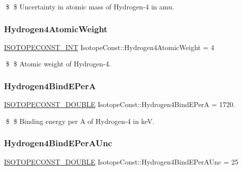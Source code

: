 \$ \$ Uncertainty in atomic mass of Hydrogen-\/4 in amu. \mbox{\label{group___isotope_const-_hydrogen-_h4_ga92d27018469bc93643e4c153de84386b}} 
\subsubsection{\texorpdfstring{Hydrogen4\+Atomic\+Weight}{Hydrogen4AtomicWeight}}
{\footnotesize\ttfamily \mbox{\hyperlink{group___isotope_const-_macros_ga5f18360b3e99483a35c32d789e62621c}{I\+S\+O\+T\+O\+P\+E\+C\+O\+N\+S\+T\+\_\+\+I\+NT}} Isotope\+Const\+::\+Hydrogen4\+Atomic\+Weight = 4}

\$ \$ Atomic weight of Hydrogen-\/4. \mbox{\label{group___isotope_const-_hydrogen-_h4_gac5261fe2e3c7d3ae4306a11f8ad232cc}} 
\subsubsection{\texorpdfstring{Hydrogen4\+Bind\+E\+PerA}{Hydrogen4BindEPerA}}
{\footnotesize\ttfamily \mbox{\hyperlink{group___isotope_const-_macros_ga8f45a7272ce02c0b4c65c44636ed719a}{I\+S\+O\+T\+O\+P\+E\+C\+O\+N\+S\+T\+\_\+\+D\+O\+U\+B\+LE}} Isotope\+Const\+::\+Hydrogen4\+Bind\+E\+PerA = 1720.}

\$ \$ Binding energy per A of Hydrogen-\/4 in keV. \mbox{\label{group___isotope_const-_hydrogen-_h4_gae868648f486f30d73156bca636635197}} 
\subsubsection{\texorpdfstring{Hydrogen4\+Bind\+E\+Per\+A\+Unc}{Hydrogen4BindEPerAUnc}}
{\footnotesize\ttfamily \mbox{\hyperlink{group___isotope_const-_macros_ga8f45a7272ce02c0b4c65c44636ed719a}{I\+S\+O\+T\+O\+P\+E\+C\+O\+N\+S\+T\+\_\+\+D\+O\+U\+B\+LE}} Isotope\+Const\+::\+Hydrogen4\+Bind\+E\+Per\+A\+Unc = 25}

